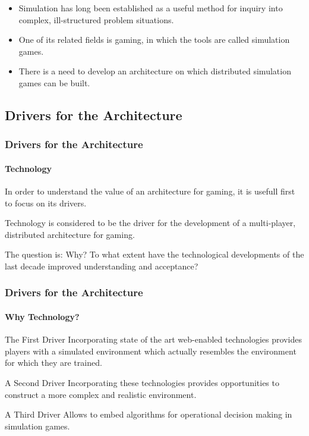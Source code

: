 \begin{frame}
\begin{itemize}[<+->]
\item
Simulation has long been established as a useful method
for inquiry into complex, ill-structured problem situations.
\item
One of its related fields is gaming, in which the tools are
called simulation games.
\item
There is a \alert{need to develop an
architecture} on which distributed simulation games can be
built.
\end{itemize}
\end{frame}

\subsection{Drivers for the Architecture}

\begin{frame}
\frametitle{Drivers for the Architecture}
\framesubtitle{Technology}
In order to understand the value of an architecture for gaming,
it is usefull first to focus on its drivers.
\pause
\begin{block}{}
Technology is considered to be the driver for
the development of a multi-player, distributed architecture
for gaming.
\end{block}
\pause
\vfill
\begin{block}{The question is:}
Why? To what extent have
the technological developments of the last decade improved
understanding and acceptance?
\end{block}
\end{frame}

\begin{frame}
\frametitle{Drivers for the Architecture}
\framesubtitle{Why Technology?}
\begin{block}{The First Driver}
Incorporating state of the art web-enabled technologies
provides players with a simulated environment
which actually resembles the environment for which they are trained.
\end{block}
\pause
\begin{block}{A Second Driver}
Incorporating these technologies provides opportunities to construct a
more complex and realistic environment.
\end{block}
\pause
\begin{block}{A Third Driver}
Allows to embed algorithms for operational
decision making in simulation games.
\end{block}
\end{frame}


